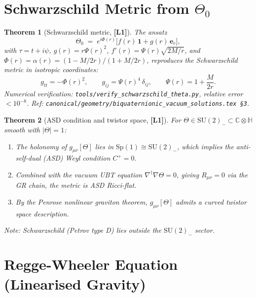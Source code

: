 \documentclass[12pt,a4paper]{article}
\newtheorem{theorem}{Theorem}[section]
\theoremstyle{definition}
\theoremstyle{remark}
\newcommand{\Lone}{\textbf{[L1]}}
\begin{document}
\section{Schwarzschild Metric from $\Theta_0$}
\label{sec:schwarzschild}

\begin{theorem}[Schwarzschild metric, \Lone]
\label{thm:schwarzschild}
The ansatz
\[
  \Theta_0 \;=\; e^{i\Phi(r)}\bigl[f(r)\,\mathbf{1} + g(r)\,\boldsymbol{e}_r\bigr],
\]
with $\tau = t + i\psi$, $g(r) = r\Psi(r)^2$, $f'(r) = \Psi(r)\sqrt{2M/r}$,
and $\Phi(r) = \alpha(r) = (1-M/2r)/(1+M/2r)$, reproduces the Schwarzschild
metric in isotropic coordinates:
\[
  g_{tt} = -\Phi(r)^2, \qquad g_{ij} = \Psi(r)^4\,\delta_{ij},
  \qquad \Psi(r) = 1 + \frac{M}{2r}.
\]
\emph{Numerical verification}: \texttt{tools/verify\_schwarzschild\_theta.py},
relative error $< 10^{-8}$.
Ref: \texttt{canonical/geometry/biquaternionic\_vacuum\_solutions.tex~\S3}.
\end{theorem}

\begin{theorem}[ASD condition and twistor space, \Lone]
\label{thm:asd}
For $\Theta \in \mathrm{SU}(2)_- \subset \mathbb{C}\otimes\mathbb{H}$ smooth with
$|\Theta|=1$:
\begin{enumerate}
  \item The holonomy of $g_{\mu\nu}[\Theta]$ lies in $\mathrm{Sp}(1)\cong\mathrm{SU}(2)_-$,
        which implies the anti-self-dual (ASD) Weyl condition $C^+ = 0$.
  \item Combined with the vacuum UBT equation $\nabla^\dagger\nabla\Theta = 0$,
        giving $R_{\mu\nu} = 0$ via the GR chain, the metric is ASD Ricci-flat.
  \item By the Penrose nonlinear graviton theorem, $g_{\mu\nu}[\Theta]$ admits a
        curved twistor space description.
\end{enumerate}
Note: Schwarzschild (Petrov type D) lies outside the $\mathrm{SU}(2)_-$ sector.
\end{theorem}

\section{Regge-Wheeler Equation (Linearised Gravity)}
\label{sec:regge_wheeler}
\end{document}
